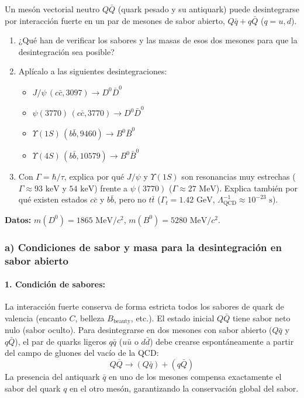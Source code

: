 \begin{problema}
Un mesón vectorial neutro $Q\bar{Q}$ (quark pesado y su antiquark) puede desintegrarse por interacción fuerte en un par de mesones de sabor abierto, $Q\bar{q} + q\bar{Q}$ ($q = u, d$).

\begin{enumerate}[label=\alph*)]
    \item ¿Qué han de verificar los sabores y las masas de esos dos mesones para que la desintegración sea posible?
    \item Aplícalo a las siguientes desintegraciones:
    \begin{itemize}
        \item $J/\psi \, (c\bar{c}, 3097) \longrightarrow D^0 \bar{D}^0$
        \item $\psi(3770) \, (c\bar{c}, 3770) \longrightarrow D^0 \bar{D}^0$
        \item $\Upsilon(1S) \, (b\bar{b}, 9460) \longrightarrow B^0 \bar{B}^0$
        \item $\Upsilon(4S) \, (b\bar{b}, 10579) \longrightarrow B^0 \bar{B}^0$
    \end{itemize}
    \item Con $\Gamma = \hbar / \tau$, explica por qué $J/\psi$ y $\Upsilon(1S)$ son resonancias muy estrechas ($\Gamma \approx 93\text{ keV}$ y $54\text{ keV}$) frente a $\psi(3770)$ ($\Gamma \approx 27\text{ MeV}$). Explica también por qué existen estados $c\bar{c}$ y $b\bar{b}$, pero no $t\bar{t}$ ($\Gamma_t = 1.42\text{ GeV}$, $\Lambda_{\text{QCD}}^{-1} \approx 10^{-23}\text{ s}$).
\end{enumerate}

\textbf{Datos:} $m(D^0) = 1865\text{ MeV}/c^2$, $m(B^0) = 5280\text{ MeV}/c^2$.

\tcblower

\subsubsection*{a) Condiciones de sabor y masa para la desintegración en sabor abierto}

\paragraph{1. Condición de sabores:}
La interacción fuerte conserva de forma estricta todos los sabores de quark de valencia (encanto $C$, belleza $B_{\text{beauty}}$, etc.). El estado inicial $Q\bar{Q}$ tiene sabor neto nulo (sabor oculto). Para desintegrarse en dos mesones con sabor abierto ($Q\bar{q}$ y $q\bar{Q}$), el par de quarks ligeros $q\bar{q}$ ($u\bar{u}$ o $d\bar{d}$) debe crearse espontáneamente a partir del campo de gluones del vacío de la QCD:
\begin{equation*}
Q\bar{Q} \longrightarrow (Q\bar{q}) + (q\bar{Q})
\end{equation*}
La presencia del antiquark $\bar{q}$ en uno de los mesones compensa exactamente el sabor del quark $q$ en el otro mesón, garantizando la conservación global del sabor.


\end{problema}
